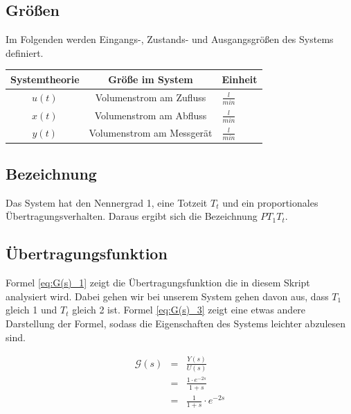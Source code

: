 \subsection{Größen}
Im Folgenden werden Eingangs-, Zustands- und Ausgangsgrößen des Systems definiert.
\renewcommand{\arraystretch}{1.5}
\begin{center}
    \begin{tabular}{ c|c|l } 
    Systemtheorie  & Größe im System & Einheit \\
    \hline
    $u(t)$ & Volumenstrom am Zufluss & $\frac{l}{min}$ \\ 
    $x(t)$ & Volumenstrom am Abfluss &  $\frac{l}{min}$\\ 
    $y(t)$ & Volumenstrom am Messgerät & $\frac{l}{min}$ \\ 
    \end{tabular}
\end{center}


\subsection{Bezeichnung}
Das System hat den Nennergrad 1, eine Totzeit $T_t$ und ein proportionales Übertragungsverhalten. Daraus ergibt sich die Bezeichnung $PT_{1}T_{t}$.

\subsection{Übertragungsfunktion}

Formel \ref{eq:G(s)_1} zeigt die Übertragungsfunktion die in diesem Skript analysiert wird. Dabei gehen wir bei unserem System gehen davon aus, dass $T_1$ gleich 1 und $T_t$ gleich 2 ist. Formel \ref{eq:G(s)_3} zeigt eine etwas andere Darstellung der Formel, sodass die Eigenschaften des Systems leichter abzulesen sind.

\begin{eqnarray}
    \label{eq:G(s)_1}
    \mathcal{G}(s) &=& \frac{Y(s)}{U(s)} \\
    \label{eq:G(s)_2}
    &=& \frac{1 \cdot e^{-2s}}{1+s} \\
    \label{eq:G(s)_3}
    &=& \frac{1}{1 + s} \cdot e^{-2s}
\end{eqnarray}


